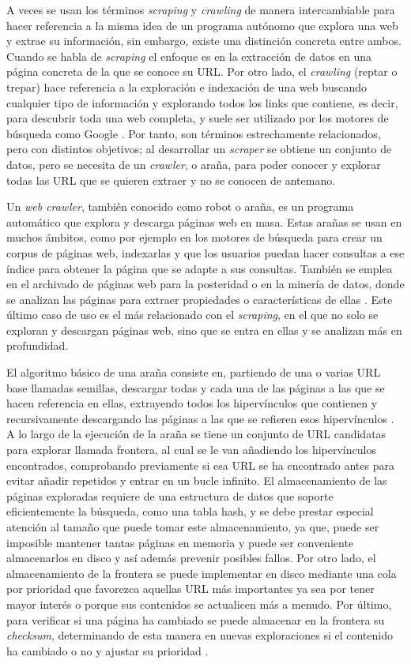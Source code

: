 A veces se usan los términos \textit{scraping} y \textit{crawling} de manera
intercambiable para hacer referencia a la misma idea de un programa autónomo que
explora una web y extrae su información, sin embargo, existe una distinción
concreta entre ambos. Cuando se habla de \textit{scraping} el enfoque es en la
extracción de datos en una página concreta de la que se conoce su URL. Por otro
lado, el \textit{crawling} (reptar o trepar) hace referencia a la exploración e
indexación de una web buscando cualquier tipo de información y explorando todos
los links que contiene, es decir, para descubrir toda una web completa, y suele
ser utilizado por los motores de búsqueda como Google \cite{scrapingvscrawling}.
Por tanto, son términos estrechamente relacionados, pero con distintos
objetivos; al desarrollar un \textit{scraper} se obtiene un conjunto de datos,
pero se necesita de un \textit{crawler}, o araña, para poder conocer y explorar
todas las URL que se quieren extraer y no se conocen de antemano.

Un \textit{web crawler}, también conocido como robot o araña, es un programa
automático que explora y descarga páginas web en masa. Estas arañas se usan en
muchos ámbitos, como por ejemplo en los motores de búsqueda para crear un corpus
de páginas web, indexarlas y que los usuarios puedan hacer consultas a ese
índice para obtener la página que se adapte a sus consultas. También se emplea
en el archivado de páginas web para la posteridad o en la minería de datos,
donde se analizan las páginas para extraer propiedades o características de
ellas \cite{olston2010web}. Este último caso de uso es el más relacionado con el
\textit{scraping}, en el que no solo se exploran y descargan páginas web, sino
que se entra en ellas y se analizan más en profundidad.

El algoritmo básico de una araña consiste en, partiendo de una o varias URL base
llamadas semillas, descargar todas y cada una de las páginas a las que se hacen
referencia en ellas, extrayendo todos los hipervínculos que contienen y
recursivamente descargando las páginas a las que se refieren esos hipervínculos
\cite{olston2010web}. A lo largo de la ejecución de la araña se tiene un
conjunto de URL candidatas para explorar llamada frontera, al cual se le van
añadiendo los hipervínculos encontrados, comprobando previamente si esa URL se
ha encontrado antes para evitar añadir repetidos y entrar en un bucle infinito.
El almacenamiento de las páginas exploradas requiere de una estructura de datos
que soporte eficientemente la búsqueda, como una tabla hash, y se debe prestar
especial atención al tamaño que puede tomar este almacenamiento, ya que, puede
ser imposible mantener tantas páginas en memoria y puede ser conveniente
almacenarlos en disco y así además prevenir posibles fallos. Por otro lado, el
almacenamiento de la frontera se puede implementar en disco mediante una cola
por prioridad que favorezca aquellas URL más importantes ya sea por tener mayor
interés o porque sus contenidos se actualicen más a menudo. Por último, para
verificar si una página ha cambiado se puede almacenar en la frontera su
\textit{checksum}, determinando de esta manera en nuevas exploraciones si el
contenido ha cambiado o no y ajustar su prioridad \cite{najork2009web}.

